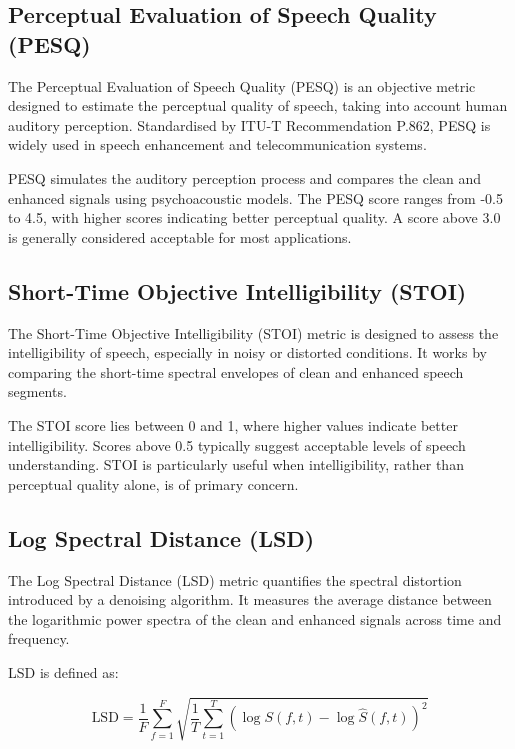 \subsection{Perceptual Evaluation of Speech Quality (PESQ)}
\label{subsec:pesq}

The Perceptual Evaluation of Speech Quality (PESQ) is an objective metric designed to estimate the perceptual quality of speech, taking into account human auditory perception. Standardised by ITU-T Recommendation P.862, PESQ is widely used in speech enhancement and telecommunication systems.

PESQ simulates the auditory perception process and compares the clean and enhanced signals using psychoacoustic models. The PESQ score ranges from -0.5 to 4.5, with higher scores indicating better perceptual quality. A score above 3.0 is generally considered acceptable for most applications.

\subsection{Short-Time Objective Intelligibility (STOI)}
\label{subsec:stoi}

The Short-Time Objective Intelligibility (STOI) metric is designed to assess the intelligibility of speech, especially in noisy or distorted conditions. It works by comparing the short-time spectral envelopes of clean and enhanced speech segments.

The STOI score lies between 0 and 1, where higher values indicate better intelligibility. Scores above 0.5 typically suggest acceptable levels of speech understanding. STOI is particularly useful when intelligibility, rather than perceptual quality alone, is of primary concern.

\subsection{Log Spectral Distance (LSD)}
\label{subsec:lsd}

The Log Spectral Distance (LSD) metric quantifies the spectral distortion introduced by a denoising algorithm. It measures the average distance between the logarithmic power spectra of the clean and enhanced signals across time and frequency.

LSD is defined as:

\begin{equation}
    \text{LSD} = \frac{1}{F} \sum_{f=1}^{F} \sqrt{ \frac{1}{T} \sum_{t=1}^{T} \left( \log S(f, t) - \log \hat{S}(f, t) \right)^2 }
\end{equation}


